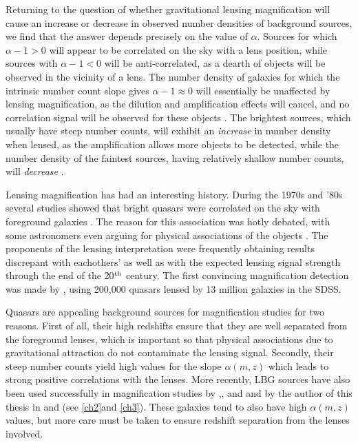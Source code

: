 Returning to the question of whether gravitational lensing magnification will cause an increase or decrease in observed number densities of background sources, we find that the answer depends precisely on the value of $\alpha$. Sources for which $\alpha -1 > 0$ will appear to be correlated on the sky with a lens position, while sources with $\alpha -1 < 0$ will be anti-correlated, as a dearth of objects will be observed in the vicinity of a lens.  The number density of galaxies for which the intrinsic number count slope gives $\alpha -1 \approx 0$ will essentially be unaffected by lensing magnification, as the dilution and amplification effects will cancel, and no correlation signal will be observed for these objects \citep{Scranton05}. The brightest sources, which usually have steep number counts, will exhibit an {\it increase} in number density when lensed, as the amplification allows more objects to be detected, while the number density of the faintest sources, having relatively shallow number counts, will {\it decrease} \citep{Narayan89}.

Lensing magnification has had an interesting history. During the 1970s and '80s several studies showed that bright quasars were correlated on the sky with foreground galaxies \citep{SeldnerPeebles79,Arp81,Webster88,Narayan89}. The reason for this association was hotly debated, with some astronomers even arguing for physical associations of the objects \citep{Arp87}. The proponents of the lensing interpretation were frequently obtaining results discrepant with eachothers' as well as with the expected lensing signal strength \citep[see e.g.][]{Schneider92} through the end of the 20$^{\rm th}$ century. The first convincing magnification detection was made by \citet{Scranton05}, using 200,000 quasars lensed by 13 million galaxies in the \acf{SDSS}.

Quasars are appealing background sources for magnification studies for two reasons. First of all, their high redshifts ensure that they are well separated from the foreground lenses, which is important so that physical associations due to gravitational attraction do not contaminate the lensing signal. Secondly, their steep number counts yield high values for the slope $\alpha(m,z)$ which leads to strong positive correlations with the lenses. More recently, \acf{LBG} sources have also been used successfully in magnification studies by \citet{Hildebrandt09b},\citet{Morrison12}, and \citet{Hildebrandt13} and by the author of this thesis in \citet{Ford12} and \citet{Ford14} (see \autoref{ch2}and \autoref{ch3}). These galaxies tend to also have high $\alpha(m,z)$ values, but more care must be taken to ensure redshift separation from the lenses involved.

